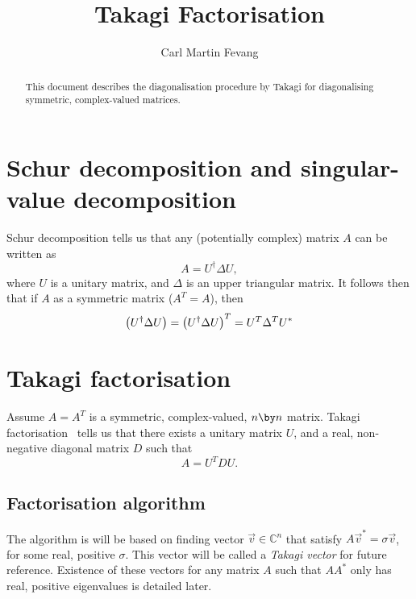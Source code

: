 \documentclass[english, notitlepage]{article}
\title{Takagi Factorisation}
\author{Carl Martin Fevang}
\begin{document}
\maketitle

\begin{abstract}
    This document describes the diagonalisation procedure by Takagi for diagonalising symmetric, complex-valued matrices.
\end{abstract}

\section{Schur decomposition and singular-value decomposition}
    Schur decomposition tells us that any (potentially complex) matrix \(A\) can be written as
    \[
        A = U^\dagger \Delta U,
    \]
    where \(U\) is a unitary matrix, and \(\Delta\) is an upper triangular matrix.
    It follows then that if \(A\) as a symmetric matrix (\(A^T = A\)), then
    \[
        \left(U^\dagger \Delta U\right) = \left(U^\dagger \Delta U\right)^T = U^T \Delta^T U^\ast
    \]

\section{Takagi factorisation}
    Assume \(A = A^T\) is a symmetric, complex-valued, \(n \by n\) matrix.
    Takagi factorisation~\autocite{Horn} tells us that there exists a unitary matrix \(U\), and a real, non-negative diagonal matrix \(D\) such that
    \begin{equation}
        \label{eq:takagi}
        A = U^T D U.
    \end{equation}

    \subsection{Factorisation algorithm}
        The algorithm is will be based on finding vector \(\vec{v} \in  \mathbb{C}^n\) that satisfy \(A \vec{v}^* = \sigma \vec{v}\), for some real, positive \(\sigma\).
        This vector will be called a \emph{Takagi vector} for future reference.
        Existence of these vectors for any matrix \(A\) such that \(AA^\ast\) only has real, positive eigenvalues is detailed later.
\end{document}
